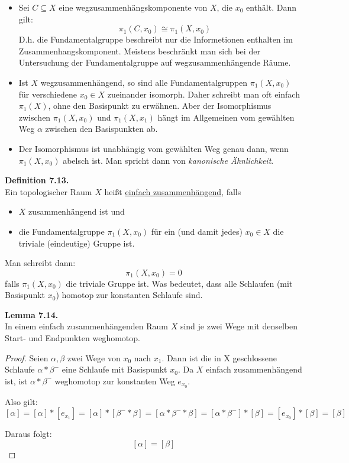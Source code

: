 \documentclass[fleqn, 12pt, letterpaper]{article}
\begin{document}
\begin{itemize}
  \item Sei \( C \subseteq X \) eine wegzusammenhängskomponente von \( X \), die \( x_0 \) enthält. Dann gilt:
\[
\quad \pi_1(C, x_0) \cong \pi_1(X, x_0)
\]
D.h. die Fundamentalgruppe beschreibt nur die Informetionen enthalten im Zusammenhangskomponent. Meistens beschränkt man sich bei der Untersuchung der Fundamentalgruppe auf wegzusammenhängende Räume.

  \item Ist \( X \) wegzusammenhängend, so sind alle Fundamentalgruppen \( \pi_1(X, x_0) \) für verschiedene \( x_0 \in X \) zueinander isomorph. Daher schreibt man oft einfach \( \pi_1(X) \), ohne den Basispunkt zu erwähnen. Aber der Isomorphismus zwischen \( \pi_1(X, x_0) \) und \( \pi_1(X, x_1) \) hängt im Allgemeinen vom gewählten Weg \( \alpha \) zwischen den Basispunkten ab.

  \item Der Isomorphismus ist unabhängig vom gewählten Weg genau dann, wenn \( \pi_1(X, x_0) \) abelsch ist. Man spricht dann von \emph{kanonische Ähnlichkeit}.
\end{itemize}

\textbf{Definition 7.13.} \\
Ein topologischer Raum \( X \) heißt \underline{einfach zusammenhängend}, falls
\begin{itemize}
  \item \( X \) zusammenhängend ist und
  \item die Fundamentalgruppe \( \pi_1(X, x_0) \) für ein (und damit jedes) \( x_0 \in X \) die triviale (eindeutige) Gruppe ist.
\end{itemize}

Man schreibt dann:
\[
\pi_1(X, x_0) = 0
\]
falls $\pi_1(X,x_0)$ die triviale Gruppe ist. Was bedeutet, dass alle Schlaufen (mit Basispunkt \( x_0 \)) homotop zur konstanten Schlaufe sind.

\vspace{1em}
\textbf{Lemma 7.14.} \\
In einem einfach zusammenhängenden Raum \( X \) sind je zwei Wege mit denselben Start- und Endpunkten weghomotop.

\begin{proof}
Seien \( \alpha, \beta \) zwei Wege von \( x_0 \) nach \( x_1 \). Dann ist die in X geschlossene Schlaufe $\alpha * \beta^{-}$
eine Schlaufe mit Basispunkt \( x_0 \). Da \( X \) einfach zusammenhängend ist, ist \( \alpha * \beta^{-} \) weghomotop zur konstanten Weg \( e_{x_0} \).

Also gilt:
\[
[\alpha]=[\alpha]*[e_{x_1}]=[\alpha]*[\beta^{-}*\beta]=[\alpha*\beta^{-}*\beta] = [\alpha*\beta^{-}]*[\beta]=[e_{x_0}]*[\beta]
= [\beta]
\]

Daraus folgt:
\[
[\alpha] = [\beta]
\]
\end{proof}
\end{document}
